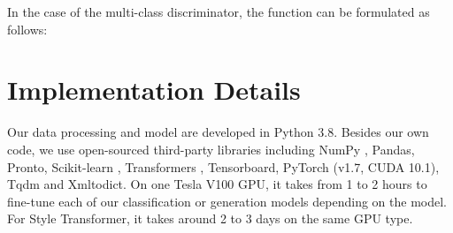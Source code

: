 \documentclass[acmsmall]{acmart}
\begin{document}
In the case of the multi-class discriminator, the function  can be formulated as follows:


\section{Implementation Details} 

Our data processing and model are developed in Python 3.8. Besides our own code, we use open-sourced third-party libraries including NumPy \citep{harris2020array}, Pandas, Pronto, Scikit-learn \citep{scikit-learn}, Transformers \citep{Wolf2019HuggingFacesTS}, Tensorboard, PyTorch \citep{NEURIPS2019_bdbca288} (v1.7, CUDA 10.1), Tqdm and Xmltodict. On one Tesla V100 GPU, it takes from 1 to 2 hours to fine-tune each of our classification or generation models depending on the model. For Style Transformer, it takes around 2 to 3 days on the same GPU type.
\end{document}
